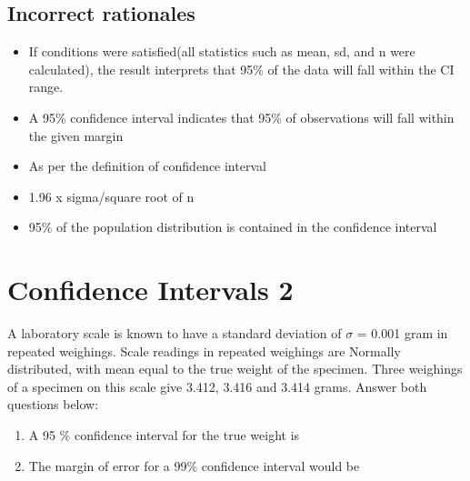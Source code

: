 \documentclass[letterpaper,9pt,twoside,printwatermark=false]{pinp}
\providecommand{\tightlist}{%
  \setlength{\itemsep}{0pt}\setlength{\parskip}{0pt}}
\begin{document}
\subsection{Incorrect rationales}\label{incorrect-rationales-2}

\begin{itemize}
\tightlist
\item
  If conditions were satisfied(all statistics such as mean, sd, and n
  were calculated), the result interprets that 95\% of the data will
  fall within the CI range.
\item
  A 95\% confidence interval indicates that 95\% of observations will
  fall within the given margin
\item
  As per the definition of confidence interval
\item
  1.96 x sigma/square root of n
\item
  95\% of the population distribution is contained in the confidence
  interval
\end{itemize}

\section{Confidence Intervals 2}\label{confidence-intervals-2}

A laboratory scale is known to have a standard deviation of \(\sigma\) =
0.001 gram in repeated weighings. Scale readings in repeated weighings
are Normally distributed, with mean equal to the true weight of the
specimen. Three weighings of a specimen on this scale give 3.412, 3.416
and 3.414 grams. Answer both questions below:

\begin{enumerate}
\def\labelenumi{\roman{enumi})}
\tightlist
\item
  A 95 \% confidence interval for the true weight is
\item
  The margin of error for a 99\% confidence interval would be
\end{enumerate}
\end{document}
